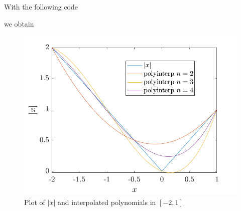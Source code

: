 \begin{solution}
  With the following code
  
  we obtain
  \begin{figure}[H]
    \centering
    \includegraphics[scale=0.5]{graphics/plot-03-04.png}
    \caption{Plot of $|x|$ and interpolated polynomials in $[-2, 1]$}
  \end{figure}
\end{solution}